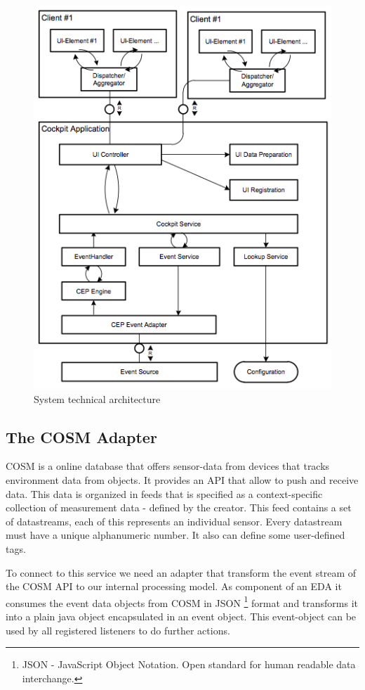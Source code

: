 \documentclass{acm_proc_article-sp}
\begin{document}
\begin{figure}[h]
	\begin{center}
		\includegraphics[scale=0.5]{sta.png}
		\caption[System technical architecture]{System technical architecture}
		\label{fig:SystemTechnicalArchitecture}
	\end{center}
\end{figure}

\subsection{The COSM Adapter}
COSM is a online database that offers sensor-data from devices that tracks environment data from objects. It provides an API that allow to push and receive data.
This data is organized in feeds that is specified as a context-specific collection of measurement data - defined by the creator. This feed contains a set of datastreams, each of this represents an individual sensor. Every datastream must have a unique alphanumeric number. It also can define some user-defined tags.

To connect to this service we need an adapter that transform the event stream of the COSM API to our internal processing model. As component of an EDA it consumes the event data objects from COSM in JSON
\footnote{JSON - JavaScript Object Notation. Open standard for human readable data interchange.} format and transforms it into a plain java object encapsulated in an event object.
This event-object can be used by all registered listeners to do further actions.
\end{document}
